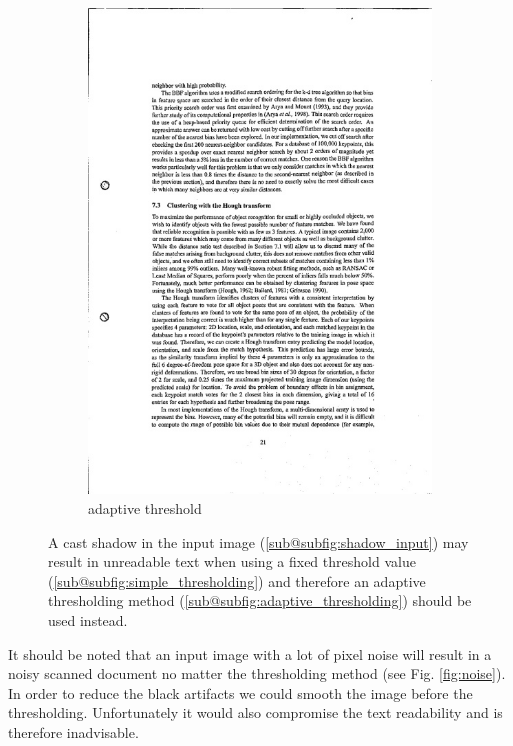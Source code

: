 \documentclass[bibliography=totoc]{scrartcl}
\begin{document}
\begin{figure}[H]
\begin{subfigure}[t]{0.28\linewidth}
		\includegraphics[width=\linewidth]{imgs/threshold/bad_lighting_adaptive.jpg}
		\caption{adaptive threshold}
		\label{subfig:adaptive_thresholding}
	\end{subfigure}
	\caption{A cast shadow in the input image (\ref{sub@subfig:shadow_input}) may result in unreadable text when using a fixed threshold value (\ref{sub@subfig:simple_thresholding}) and therefore an adaptive thresholding method  (\ref{sub@subfig:adaptive_thresholding}) should be used instead.}
	\label{fig:thresholding}
\end{figure}

It should be noted that an input image with a lot of pixel noise will result in a noisy scanned document no matter the thresholding method (see Fig. \ref{fig:noise}).
In order to reduce the black artifacts we could smooth the image before the thresholding.
Unfortunately it would also compromise the text readability and is therefore inadvisable.\\
\end{document}
